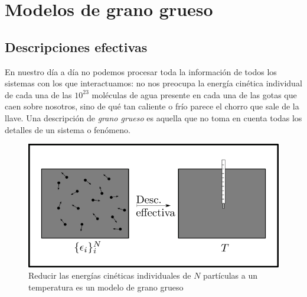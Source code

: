 \section{Modelos de grano grueso}\label{sec:Ch1CG}

\subsection{Descripciones efectivas}

En nuestro día a día no podemos procesar toda la información de todos los sistemas con los que interactuamos: no nos preocupa la energía cinética individual de cada una de las $10^{23}$ moléculas de agua presente en cada una de las gotas que caen sobre nosotros, sino de qué tan caliente o frío parece el chorro que sale de la llave. Una descripción de \textit{grano grueso} es aquella que no toma en cuenta todas los detalles de un sistema o fenómeno. 

\begin{figure}[ht]
    \centering
    \includegraphics[width=0.6\linewidth]{chapter1/figures/CGT.png}
    \caption{Reducir las energías cinéticas individuales de $N$ partículas a un temperatura es un modelo de grano grueso }
    \label{fig:KtoT}
\end{figure}


